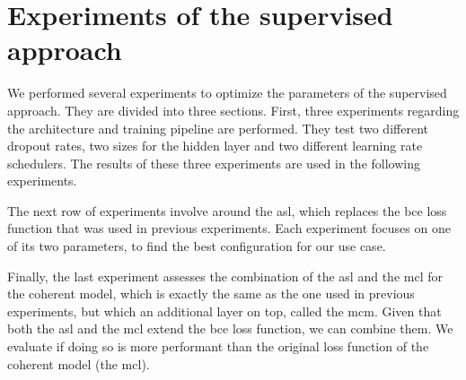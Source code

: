 \section{Experiments of the supervised approach} \label{supervised_approach_experiments}

We performed several experiments to optimize the parameters of the supervised approach. They are divided into three sections. First, three experiments regarding the architecture and training pipeline are performed. They test two different dropout rates, two sizes for the hidden layer and two different learning rate schedulers. The results of these three experiments are used in the following experiments.

The next row of experiments involve around the \acrfull{asl}, which replaces the \acrshort{bce} loss function that was used in previous experiments. Each experiment focuses on one of its two parameters, to find the best configuration for our use case.

Finally, the last experiment assesses the combination of the \acrshort{asl} and the \acrfull{mcl} for the coherent model, which is exactly the same as the one used in previous experiments, but which an additional layer on top, called the \acrlong{mcm}. Given that both the \acrshort{asl} and the \acrfull{mcl} extend the \acrshort{bce} loss function, we can combine them. We evaluate if doing so is more performant than the original loss function of the coherent model (the \acrshort{mcl}).




